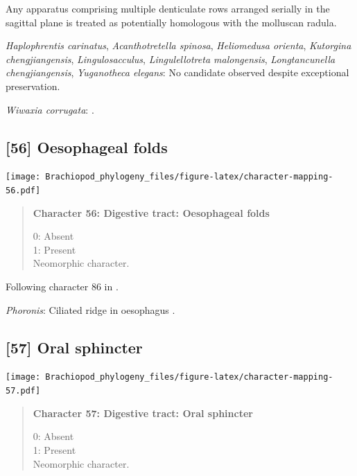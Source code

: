 \documentclass[openany]{book}
\begin{document}
Any apparatus comprising multiple denticulate rows arranged serially in
the sagittal plane is treated as potentially homologous with the
molluscan radula.

\hypertarget{Acanthotretella_spinosa-coding-55}{}
\emph{Haplophrentis carinatus}, \emph{Acanthotretella spinosa},
\emph{Heliomedusa orienta}, \emph{Kutorgina chengjiangensis},
\emph{Lingulosacculus}, \emph{Lingulellotreta malongensis},
\emph{Longtancunella chengjiangensis}, \emph{Yuganotheca elegans}: No
candidate observed despite exceptional preservation.

\hypertarget{Wiwaxia_corrugata-coding-55}{}
\emph{Wiwaxia corrugata}: \citet{Smith2012M}.

\subsection*{{[}56{]} Oesophageal folds}\label{oesophageal-folds}

\texttt{[image: Brachiopod\_phylogeny\_files/figure-latex/character-mapping-56.pdf]}

\begin{quote}
\textbf{Character 56: Digestive tract: Oesophageal folds}

0: Absent\\
1: Present\\
Neomorphic character.
\end{quote}

Following character 86 in \citet{Giribet2002}.

\hypertarget{Phoronis-coding-56}{}
\emph{Phoronis}: Ciliated ridge in oesophagus \citep{Torrey1901}.

\subsection*{{[}57{]} Oral sphincter}\label{oral-sphincter}

\texttt{[image: Brachiopod\_phylogeny\_files/figure-latex/character-mapping-57.pdf]}

\begin{quote}
\textbf{Character 57: Digestive tract: Oral sphincter}

0: Absent\\
1: Present\\
Neomorphic character.
\end{quote}
\end{document}

